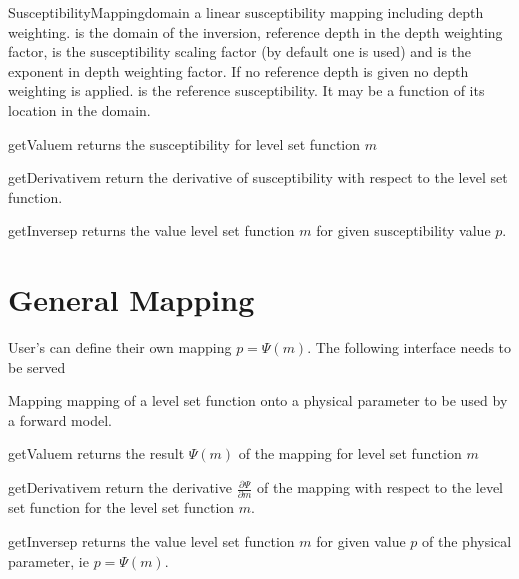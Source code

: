 \begin{classdesc}{SusceptibilityMapping}{domain }
a linear susceptibility mapping including depth weighting.  is the domain of the 
inversion,  reference depth in the depth weighting factor, 
 is the susceptibility scaling factor (by default one is used) and
 is the exponent in depth weighting factor. If no reference depth  is given
no depth weighting is applied.  is the reference susceptibility. It may be a function 
of its location in the domain. 
\end{classdesc}
\begin{methoddesc}[SusceptibilityMapping]{getValue}{m}
returns the susceptibility for level set function $m$
\end{methoddesc}

\begin{methoddesc}[SusceptibilityMapping]{getDerivative}{m}
return the derivative of susceptibility  with respect to the level set function.
\end{methoddesc}  

\begin{methoddesc}[SusceptibilityMapping]{getInverse}{p}
returns the value level set function $m$ for given susceptibility value $p$.
\end{methoddesc}


\section{General Mapping}
User's can define their own mapping $p=\Psi(m)$. The following interface needs to be served

\begin{classdesc}{Mapping}{}
mapping of a level set function onto a physical parameter to be used by a forward model.
\end{classdesc} 

\begin{methoddesc}[Mapping]{getValue}{m}
returns the result $\Psi(m)$ of the mapping for level set function $m$
\end{methoddesc}

\begin{methoddesc}[Mapping]{getDerivative}{m}
return the derivative $\frac{\partial \Psi}{\partial m}$ of the mapping with respect to the level set function for 
the level set function $m$.
\end{methoddesc}  

\begin{methoddesc}[Mapping]{getInverse}{p}
returns the value level set function $m$ for given value $p$ of the physical parameter, ie $p=\Psi(m)$.  
\end{methoddesc}





